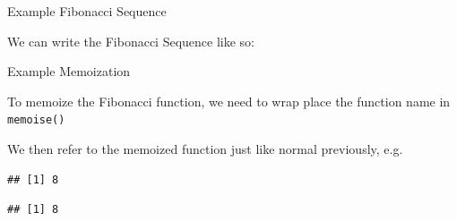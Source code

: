 \begin{frame}[fragile]{Example Fibonacci Sequence}

We can write the Fibonacci Sequence like so:

\begin{Shaded}
\begin{Highlighting}[]
\StringTok{ }
   \StringTok{ }\NormalTok{) \{}
     \NormalTok{(}\NormalTok{)}
   \NormalTok{\}}
  
   \NormalTok{(}\NormalTok{) +}\StringTok{ }\NormalTok{))}
\NormalTok{\}}
\end{Highlighting}
\end{Shaded}

\end{frame}

\begin{frame}[fragile]{Example Memoization}

To memoize the Fibonacci function, we need to wrap place the function
name in \texttt{memoise()}

\begin{Shaded}
\begin{Highlighting}[]
\NormalTok{(}\NormalTok{)}
\StringTok{ }
\end{Highlighting}
\end{Shaded}

We then refer to the memoized function just like normal previously, e.g.

\begin{Shaded}
\begin{Highlighting}[]
\NormalTok{(}\NormalTok{) }
\end{Highlighting}
\end{Shaded}

\begin{verbatim}
## [1] 8
\end{verbatim}

\begin{Shaded}
\begin{Highlighting}[]
\NormalTok{(}\NormalTok{)   }
\end{Highlighting}
\end{Shaded}

\begin{verbatim}
## [1] 8
\end{verbatim}

\end{frame}

